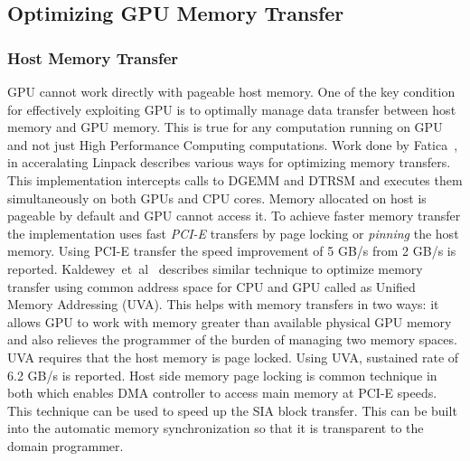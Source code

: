 \subsection{Optimizing GPU Memory Transfer}
\subsubsection{Host Memory Transfer}
GPU cannot work directly with pageable host memory. One of the key condition for
effectively exploiting GPU is to optimally manage data transfer between host memory
and GPU memory. This is true for any computation running on GPU and not just High
Performance Computing computations. Work done by Fatica~\cite{Fatica:2009:ALC:1513895.1513901},
in acceralating Linpack describes various ways for optimizing memory transfers. This
implementation intercepts calls to DGEMM and DTRSM and executes them simultaneously
on both GPUs and CPU cores. Memory allocated on host is pageable by default and GPU
cannot access it. To achieve faster memory transfer the implementation uses fast
\textit{PCI-E} transfers by page locking or \textit{pinning} the host memory. Using
PCI-E transfer the speed improvement of 5 GB/s from 2 GB/s is reported.
Kaldewey~et~al~\cite{Kaldewey:2012:GJP:2236584.2236592} describes similar technique
to optimize memory transfer using common address space for CPU and GPU called as
Unified Memory Addressing (UVA). This helps with memory transfers in two ways: it
allows GPU to work with memory greater than available physical GPU memory and also relieves
the programmer of the burden of managing two memory spaces. UVA requires that the
host memory is page locked. Using UVA, sustained rate of 6.2 GB/s is reported.
Host side memory page locking is common technique in both which enables DMA controller
to access main memory at PCI-E speeds. This technique can be used to speed up the
SIA block transfer. This can be built into the automatic memory synchronization
so that it is transparent to the domain programmer.

